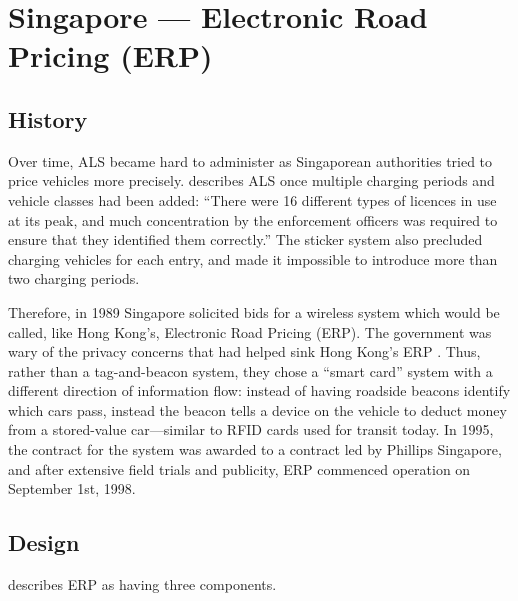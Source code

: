\section{Singapore --- Electronic Road Pricing (ERP)}

\subsection{History}

Over time, ALS became hard to administer as Singaporean authorities tried to price vehicles more precisely. \citet[p. 4]{Chin2010} describes ALS once multiple charging periods and vehicle classes had been added: ``There were 16 different types of licences in use at its peak, and much concentration by the enforcement officers was required to ensure that they identified them correctly.'' The sticker system also precluded charging vehicles for each entry, and made it impossible to introduce more than two charging periods.

Therefore, in 1989 Singapore solicited bids for a wireless system which would be called, like Hong Kong's, Electronic Road Pricing (ERP). The government was wary of the privacy concerns that had helped sink Hong Kong's ERP \citep{PhangToh1997,Chin2010}. Thus, rather than a tag-and-beacon system, they chose a ``smart card'' system with a different direction of information flow: instead of having roadside beacons identify which cars pass, instead the beacon tells a device on the vehicle to deduct money from a stored-value car---similar to RFID cards used for transit today. In 1995, the contract for the system was awarded to a contract led by Phillips Singapore, and after extensive field trials and publicity, ERP commenced operation on September 1st, 1998.

\subsection{Design}

\citet{Menon2004} describes ERP as having three components.

